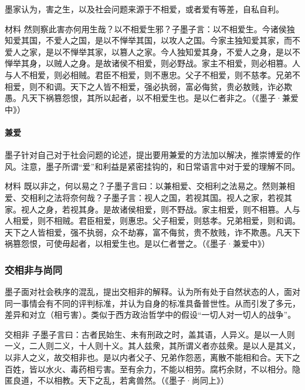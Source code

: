 墨家认为，害之生，以及社会问题来源于不相爱，或者爱有等差，自私自利。

\begin{fancybox}{材料}
    然则察此害亦何用生哉？以不相爱生邪？子墨子言：以不相爱生。今诸侯独知爱其国，不爱人之国，是以不惮举其国，以攻人之国。今家主独知爱其家，而不爱人之家，是以不惮举其家，以篡人之家。今人独知爱其身，不爱人之身，是以不惮举其身，以贼人之身。是故诸侯不相爱，则必野战。家主不相爱，则必相篡。人与人不相爱，则必相贼。君臣不相爱，则不惠忠。父子不相爱，则不慈孝。兄弟不相爱，则不和调。天下之人皆不相爱，强必执弱，富必侮贫，贵必敖贱，诈必欺愚。凡天下祸篡怨恨，其所以起者，以不相爱生也。是以仁者非之。（《墨子·兼爱中》）    
\end{fancybox}

\paragraph{兼爱}

墨子针对自己对于社会问题的论述，提出要用兼爱的方法加以解决，推崇博爱的作风。注意，墨子所谓“爱”和利益是紧密挂钩的，和日常语言中对于爱的理解不同。

\begin{fancybox}{材料}
    既以非之，何以易之？子墨子言曰：以兼相爱、交相利之法易之。然则兼相爱、交相利之法将奈何哉？子墨子言：视人之国，若视其国。视人之家，若视其家。视人之身，若视其身。是故诸侯相爱，则不野战。家主相爱，则不相篡。人与人相爱，则不相贼。君臣相爱，则惠忠。父子相爱，则慈孝。兄弟相爱，则和调。天下之人皆相爱，强不执弱，众不劫寡，富不侮贫，贵不敖贱，诈不欺愚。凡天下祸篡怨恨，可使毋起者，以相爱生也。是以仁者誉之。（《墨子·兼爱中》）
\end{fancybox}

\subsubsection{交相非与尚同}

墨子面对社会秩序的混乱，提出交相非的解释。认为所有处于自然状态的人，面对同一事情会有不同的评判标准，并认为自身的标准具备普世性。从而引发了多元，差异和对立（相亏害）。类似于西方政治哲学中的假设“一切人对一切人的战争”。

\begin{fancybox}{交相非}
    子墨子言曰：古者民始生、未有刑政之时，盖其语，人异义。是以一人则一义，二人则二义，十人则十义。其人兹衆，其所谓义者亦兹衆。是以人是其义，以非人之义，故交相非也。是以内者父子、兄弟作怨恶，离散不能相和合。天下之百姓，皆以水火、毒药相亏害。至有余力，不能以相劳。腐朽余财，不以相分。隐匿良道，不以相教。天下之乱，若禽兽然。（《墨子·尚同上》）
\end{fancybox}

